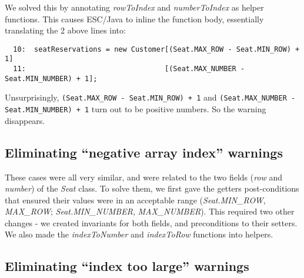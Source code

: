 \documentclass{article}
\begin{document}
We solved this by annotating \emph{rowToIndex} and \emph{numberToIndex} as helper functions. This causes ESC/Java to inline the function body, essentially translating the 2 above lines into:

\begin{verbatim}
  10:  seatReservations = new Customer[(Seat.MAX_ROW - Seat.MIN_ROW) + 1]
  11:                                 [(Seat.MAX_NUMBER - Seat.MIN_NUMBER) + 1];
\end{verbatim}

Unsurprisingly, \verb|(Seat.MAX_ROW - Seat.MIN_ROW) + 1| and \verb|(Seat.MAX_NUMBER - Seat.MIN_NUMBER) + 1| turn out to be positive numbers. So the warning disappears.

\subsection{Eliminating ``negative array index'' warnings}

These cases were all very similar, and were related to the two fields (\emph{row} and \emph{number}) of the \emph{Seat} class. To solve them, we first gave the getters post-conditions that ensured their values were in an acceptable range (\emph{Seat.MIN\_ROW}, \emph{MAX\_ROW}; \emph{Seat.MIN\_NUMBER}, \emph{MAX\_NUMBER}). This required two other changes - we created invariants for both fields, and preconditions to their setters. We also made the \emph{indexToNumber} and \emph{indexToRow} functions into helpers.

\subsection{Eliminating ``index too large'' warnings}
\end{document}
